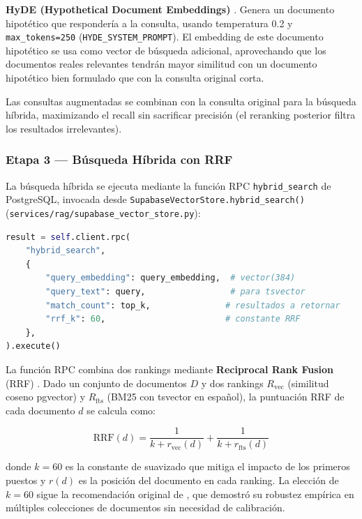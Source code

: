 \textbf{HyDE (Hypothetical Document Embeddings)} \citep{Gao2022}. Genera un documento hipotético que respondería a la consulta, usando temperatura 0.2 y \texttt{max\_tokens=250} (\texttt{HYDE\_SYSTEM\_PROMPT}). El embedding de este documento hipotético se usa como vector de búsqueda adicional, aprovechando que los documentos reales relevantes tendrán mayor similitud con un documento hipotético bien formulado que con la consulta original corta.

Las consultas augmentadas se combinan con la consulta original para la búsqueda híbrida, maximizando el recall sin sacrificar precisión (el reranking posterior filtra los resultados irrelevantes).

\subsubsection{Etapa 3 — Búsqueda Híbrida con RRF}
\label{sec:hybrid_search}

La búsqueda híbrida se ejecuta mediante la función RPC \texttt{hybrid\_search} de PostgreSQL, invocada desde \texttt{SupabaseVectorStore.hybrid\_search()} (\texttt{services/rag/supabase\_vector\_store.py}):

\begin{lstlisting}[language=Python, basicstyle=\ttfamily\footnotesize,
  backgroundcolor=\color{codebg}, frame=single, rulecolor=\color{gray!30},
  breaklines=true, columns=fullflexible]
result = self.client.rpc(
    "hybrid_search",
    {
        "query_embedding": query_embedding,  # vector(384)
        "query_text": query,                 # para tsvector
        "match_count": top_k,               # resultados a retornar
        "rrf_k": 60,                        # constante RRF
    },
).execute()
\end{lstlisting}

La función RPC combina dos rankings mediante \textbf{Reciprocal Rank Fusion} (RRF) \citep{Cormack2009}. Dado un conjunto de documentos $D$ y dos rankings $R_{\text{vec}}$ (similitud coseno pgvector) y $R_{\text{fts}}$ (BM25 con tsvector en español), la puntuación RRF de cada documento $d$ se calcula como:

\begin{equation}
\text{RRF}(d) = \frac{1}{k + r_{\text{vec}}(d)} + \frac{1}{k + r_{\text{fts}}(d)}
\label{eq:rrf}
\end{equation}

donde $k=60$ es la constante de suavizado que mitiga el impacto de los primeros puestos y $r(d)$ es la posición del documento en cada ranking. La elección de $k=60$ sigue la recomendación original de \citet{Cormack2009}, que demostró su robustez empírica en múltiples colecciones de documentos sin necesidad de calibración.

